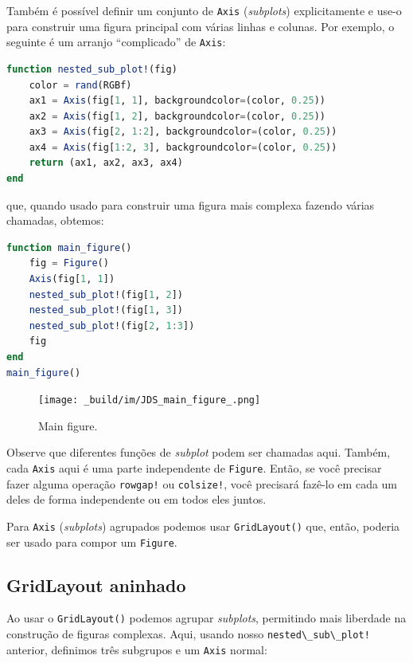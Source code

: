 \documentclass[
  notoc %
]{tufte-book}
\newcommand{\passthrough}[1]{#1}
\begin{document}
Também é possível definir um conjunto de \passthrough{\lstinline!Axis!}
(\emph{subplots}) explicitamente e use-o para construir uma figura
principal com várias linhas e colunas. Por exemplo, o seguinte é um
arranjo ``complicado'' de \passthrough{\lstinline!Axis!}:

\begin{lstlisting}[language=Julia]
function nested_sub_plot!(fig)
    color = rand(RGBf)
    ax1 = Axis(fig[1, 1], backgroundcolor=(color, 0.25))
    ax2 = Axis(fig[1, 2], backgroundcolor=(color, 0.25))
    ax3 = Axis(fig[2, 1:2], backgroundcolor=(color, 0.25))
    ax4 = Axis(fig[1:2, 3], backgroundcolor=(color, 0.25))
    return (ax1, ax2, ax3, ax4)
end
\end{lstlisting}

que, quando usado para construir uma figura mais complexa fazendo várias
chamadas, obtemos:

\begin{lstlisting}[language=Julia]
function main_figure()
    fig = Figure()
    Axis(fig[1, 1])
    nested_sub_plot!(fig[1, 2])
    nested_sub_plot!(fig[1, 3])
    nested_sub_plot!(fig[2, 1:3])
    fig
end
main_figure()
\end{lstlisting}

\begin{figure}
\hypertarget{fig:main_figure}{%
\centering
\texttt{[image: \_build/im/JDS\_main\_figure\_.png]}
\caption{Main figure.}\label{fig:main_figure}
}
\end{figure}

Observe que diferentes funções de \emph{subplot} podem ser chamadas
aqui. Também, cada \passthrough{\lstinline!Axis!} aqui é uma parte
independente de \passthrough{\lstinline!Figure!}. Então, se você
precisar fazer alguma operação \passthrough{\lstinline"rowgap!"} ou
\passthrough{\lstinline"colsize!"}, você precisará fazê-lo em cada um
deles de forma independente ou em todos eles juntos.

Para \passthrough{\lstinline!Axis!} (\emph{subplots}) agrupados podemos
usar \passthrough{\lstinline!GridLayout()!} que, então, poderia ser
usado para compor um \passthrough{\lstinline!Figure!}.

\hypertarget{gridlayout-aninhado}{%
\subsection{GridLayout aninhado}\label{gridlayout-aninhado}}

Ao usar o \passthrough{\lstinline!GridLayout()!} podemos agrupar
\emph{subplots}, permitindo mais liberdade na construção de figuras
complexas. Aqui, usando nosso
\passthrough{\lstinline"nested\_sub\_plot!"} anterior, definimos três
subgrupos e um \passthrough{\lstinline!Axis!} normal:
\end{document}
